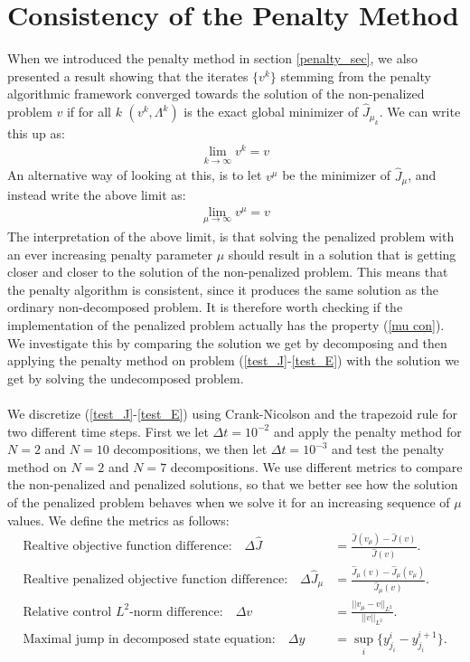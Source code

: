 \section{Consistency of the Penalty Method} \label{consistency_sec}
When we introduced the penalty method in section \ref{penalty_sec}, we also presented a result showing that the iterates $\{v^k\}$ stemming from the penalty algorithmic framework converged towards the solution of the non-penalized problem $v$ if for all $k$ $(v^k,\Lambda^k)$ is the exact global minimizer of $\hat J_{\mu_k}$. We can write this up as:
\begin{align*}
\lim_{k\rightarrow\infty} v^k = v 
\end{align*}  
An alternative way of looking at this, is to let $v^{\mu}$ be the minimizer of $\hat J_{\mu}$, and instead write the above limit as:
\begin{align}
\lim_{\mu\rightarrow\infty} v^{\mu} = v \label{mu con}
\end{align}
The interpretation of the above limit, is that solving the penalized problem with an ever increasing penalty parameter $\mu$ should result in a solution that is getting closer and closer to the solution of the non-penalized problem. This means that the penalty algorithm is consistent, since it produces the same solution as the ordinary non-decomposed problem. It is therefore worth checking if the implementation of the penalized problem actually has the property (\ref{mu con}). We investigate this by comparing the solution we get by decomposing and then applying the penalty method on problem (\ref{test_J}-\ref{test_E}) with the solution we get by solving the undecomposed problem. 
\\
\\
We discretize (\ref{test_J}-\ref{test_E}) using Crank-Nicolson and the trapezoid rule for two different time steps. First we let $\Delta t = 10^{-2}$ and apply the penalty method for $N=2$ and $N=10$ decompositions, we then let $\Delta t = 10^{-3}$ and test the penalty method on $N=2$ and $N=7$ decompositions. We use different metrics to compare the non-penalized and penalized solutions, so that we better see how the solution of the penalized problem behaves when we solve it for an increasing sequence of $\mu$ values. We define the metrics as follows:
\begin{align}
\textrm{Realtive objective function difference:}\quad \Delta \hat J &= \frac{\hat{J}(v_{\mu})-\hat{J}(v)}{\hat{J}(v)}.\label{mes1}\\
\textrm{Realtive penalized objective function difference:}\quad \Delta \hat J_{\mu} &= \frac{\hat{J}_{\mu}(v)-\hat{J}_{\mu}(v_{\mu})}{\hat{J}_{\mu}(v)}.\\
\textrm{Relative control $L^2$-norm difference:}\quad \Delta v&=\frac{||v_{\mu}-v||_ {L^2}}{||v||_{L^2}}. \\
\textrm{Maximal jump in decomposed state equation:}\quad \Delta y&= \sup_i\{y_{j_i}^i-y_{j_i}^{i+1}\}.\label{mes4}
\end{align}
